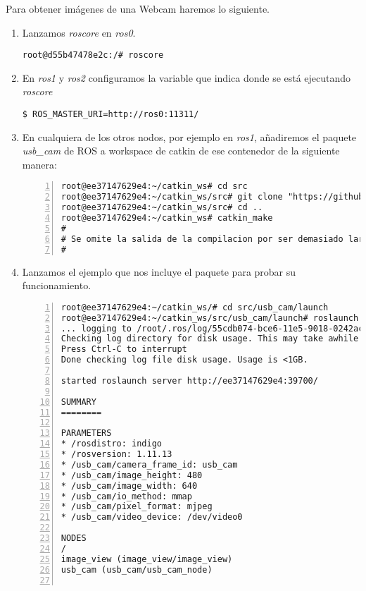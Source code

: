 		Para obtener imágenes de una Webcam haremos lo siguiente.
		\begin{enumerate}
			\item Lanzamos \emph{roscore} en \emph{ros0}.
			\begin{lstlisting}[style=consola]
root@d55b47478e2c:/# roscore
			\end{lstlisting}
			
			\item En \emph{ros1} y \emph{ros2} configuramos la variable que indica donde se está ejecutando \emph{roscore}
			\begin{lstlisting}[style=consola]
$ ROS_MASTER_URI=http://ros0:11311/
			\end{lstlisting}
			
			\item En cualquiera de los otros nodos, por ejemplo en \emph{ros1}, añadiremos el paquete \textit{usb\_cam} de ROS a workspace de catkin de ese contenedor de la siguiente manera:
			\begin{lstlisting}[style=consola,numbers=left]
root@ee37147629e4:~/catkin_ws# cd src
root@ee37147629e4:~/catkin_ws/src# git clone "https://github.com/bosch-ros-pkg/usb_cam.git"
root@ee37147629e4:~/catkin_ws/src# cd ..
root@ee37147629e4:~/catkin_ws# catkin_make
#
# Se omite la salida de la compilacion por ser demasiado larga
#
			\end{lstlisting}
			
			\item Lanzamos el ejemplo que nos incluye el paquete para probar su funcionamiento.
			\begin{lstlisting}[style=consola,numbers=left]
root@ee37147629e4:~/catkin_ws/# cd src/usb_cam/launch
root@ee37147629e4:~/catkin_ws/src/usb_cam/launch# roslaunch usb_cam-test.launch
... logging to /root/.ros/log/55cdb074-bce6-11e5-9018-0242ac110002/roslaunch-ee37147629e4-221.log
Checking log directory for disk usage. This may take awhile.
Press Ctrl-C to interrupt
Done checking log file disk usage. Usage is <1GB.

started roslaunch server http://ee37147629e4:39700/

SUMMARY
========

PARAMETERS
* /rosdistro: indigo
* /rosversion: 1.11.13
* /usb_cam/camera_frame_id: usb_cam
* /usb_cam/image_height: 480
* /usb_cam/image_width: 640
* /usb_cam/io_method: mmap
* /usb_cam/pixel_format: mjpeg
* /usb_cam/video_device: /dev/video0

NODES
/
image_view (image_view/image_view)
usb_cam (usb_cam/usb_cam_node)


\end{lstlisting}
\end{enumerate}
